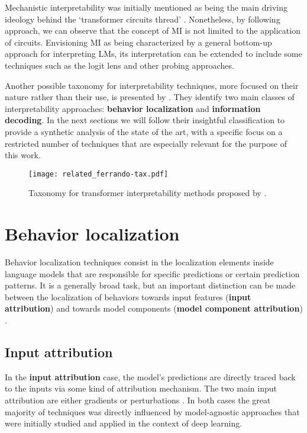 Mechanistic interpretability was initially mentioned as being the main driving ideology behind the `transformer circuits thread' .
Nonetheless, by following \citet{rai2024} approach, we can observe that the concept of MI is not limited to the application of circuits.
Envisioning MI as being characterized by a general bottom-up approach for interpreting LMs, its interpretation can be extended to include some  techniques such as the logit lens \cite{nostalgebraist2020} and other probing approaches.

Another possible taxonomy for interpretability techniques, more focused on their nature rather than their use, is presented by \citet{ferrando2024}.
They identify two main classes of interpretability approaches: \textbf{behavior localization} and \textbf{information decoding}.
In the next sections we will follow their insightful classification to provide a synthetic analysis of the state of the art, with a specific focus on a restricted number of techniques that are especially relevant for the purpose of this work.

\begin{figure}[H]
    \centering
    \texttt{[image: related\_ferrando-tax.pdf]}
    \caption{Taxonomy for transformer interpretability methods proposed by \citet{ferrando2024}.}
    \label{fig:related_ferrando-tax}
\end{figure}

\section{Behavior localization}

Behavior localization techniques consist in the localization elements inside language models that are responsible for specific predictions or certain prediction patterns.
It is a generally broad task, but an important distinction can be made between the localization of behaviors towards input features (\textbf{input attribution}) and towards model components (\textbf{model component attribution}) \cite{ferrando2024}. 

\subsection{Input attribution}

In the \textbf{input attribution} case, the model's predictions are directly traced back to the inputs via some kind of attribution mechanism.
The two main input attribution  are either gradients \cite{denil2014, ding2021, sanyal2021, enguehard2023} or perturbations \cite{li2016, amara2024, mohebbi2023}.
In both cases the great majority of techniques was directly influenced by model-agnostic approaches \cite{sundararajan2017, smilkov2017, ribeiro2016, lundberg2017} that were initially studied and applied in the context of deep learning.

